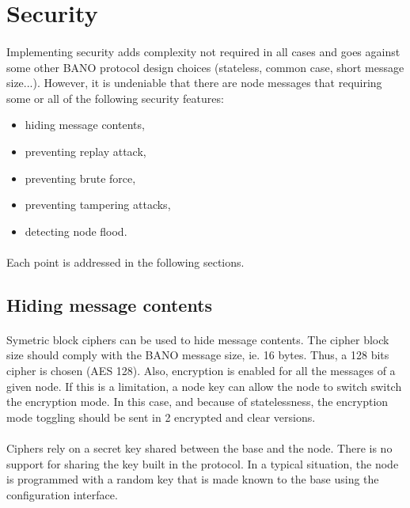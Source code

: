 \documentclass[a4paper, 11pt]{article}
\begin{document}
\paragraph{}


\clearpage
\section{Security}

\paragraph{}
Implementing security adds complexity not required in all cases and goes
against some other BANO protocol design choices (stateless, common case,
short message size...). However, it is undeniable that there are node
messages that requiring some or all of the following security features:
\begin{itemize}
\item hiding message contents,
\item preventing replay attack,
\item preventing brute force,
\item preventing tampering attacks,
\item detecting node flood.
\end{itemize}

\paragraph{}
Each point is addressed in the following sections.

\subsection{Hiding message contents}
\paragraph{}
Symetric block ciphers can be used to hide message contents. The cipher
block size should comply with the BANO message size, ie. 16 bytes. Thus,
a 128 bits cipher is chosen (AES 128). Also, encryption is enabled for
all the messages of a given node. If this is a limitation, a node key
can allow the node to switch switch the encryption mode. In this case,
and because of statelessness, the encryption mode toggling should be
sent in 2 encrypted and clear versions.
\paragraph{}
Ciphers rely on a secret key shared between the base and the node. There
is no support for sharing the key built in the protocol. In a typical
situation, the node is programmed with a random key that is made known
to the base using the configuration interface.
\end{document}
